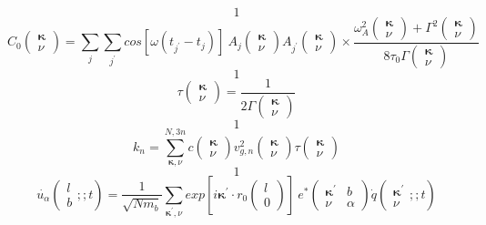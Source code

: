 \[1\] 
\[C_0\left( \begin{array}{c}
{\mathbf \kappa } \\ 
\nu  \end{array}
\right)=\sum\limits_j{\sum\limits_{j^'}{{cos [\omega \left(t_{j^'}-t_j\right)]\ }A_j\left( \begin{array}{c}
{\mathbf \kappa } \\ 
\nu  \end{array}
\right)A_{j^'}\left( \begin{array}{c}
{\mathbf \kappa } \\ 
\nu  \end{array}
\right)\times \frac{{\omega }^2_A\left( \begin{array}{c}
{\mathbf \kappa } \\ 
\nu  \end{array}
\right)+{\Gamma }^2\left( \begin{array}{c}
{\mathbf \kappa } \\ 
\nu  \end{array}
\right)}{{8\tau }_0\Gamma \left( \begin{array}{c}
{\mathbf \kappa } \\ 
\nu  \end{array}
\right)}}}\] 
\[1\] 
\[\tau \left( \begin{array}{c}
{\mathbf \kappa } \\ 
\nu  \end{array}
\right)=\frac{1}{2\Gamma \left( \begin{array}{c}
{\mathbf \kappa } \\ 
\nu  \end{array}
\right)}\] 
\[1\] 
\[k_n=\sum\limits^{N,3n}_{{\mathbf \kappa },\nu }{c\left( \begin{array}{c}
{\mathbf \kappa } \\ 
\nu  \end{array}
\right)v^2_{g,n}\left( \begin{array}{c}
{\mathbf \kappa } \\ 
\nu  \end{array}
\right)\tau \left( \begin{array}{c}
{\mathbf \kappa } \\ 
\nu  \end{array}
\right)}\] 
\[1\] 
\[\dot{u_{\alpha }}\left( \begin{array}{c}
l \\ 
b \end{array}
;;t\right)=\frac{1}{\sqrt{Nm_b}}\sum\limits_{{{\mathbf \kappa }}^',\nu }{{exp \left[i{{\mathbf \kappa }}^'\cdot r_0\left( \begin{array}{c}
l \\ 
0 \end{array}
\right)\right]\ }e^*\left( \begin{array}{cc}
{{\mathbf \kappa }}^' & b \\ 
\nu  & \alpha  \end{array}
\right)\dot{q}\left( \begin{array}{c}
{{\mathbf \kappa }}^' \\ 
\nu  \end{array}
;;t\right)}\] 
